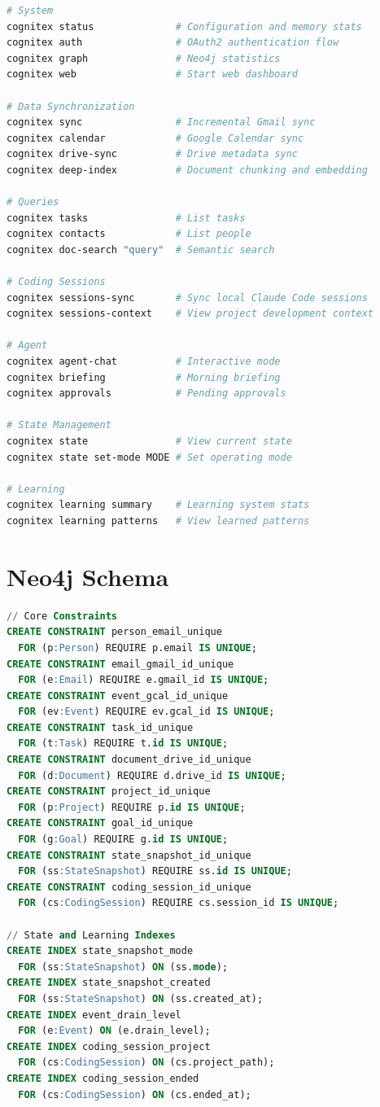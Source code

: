 \documentclass[11pt,a4paper]{article}
\begin{document}
\begin{lstlisting}[language=bash,caption={Primary CLI commands}]
# System
cognitex status              # Configuration and memory stats
cognitex auth                # OAuth2 authentication flow
cognitex graph               # Neo4j statistics
cognitex web                 # Start web dashboard

# Data Synchronization
cognitex sync                # Incremental Gmail sync
cognitex calendar            # Google Calendar sync
cognitex drive-sync          # Drive metadata sync
cognitex deep-index          # Document chunking and embedding

# Queries
cognitex tasks               # List tasks
cognitex contacts            # List people
cognitex doc-search "query"  # Semantic search

# Coding Sessions
cognitex sessions-sync       # Sync local Claude Code sessions
cognitex sessions-context    # View project development context

# Agent
cognitex agent-chat          # Interactive mode
cognitex briefing            # Morning briefing
cognitex approvals           # Pending approvals

# State Management
cognitex state               # View current state
cognitex state set-mode MODE # Set operating mode

# Learning
cognitex learning summary    # Learning system stats
cognitex learning patterns   # View learned patterns
\end{lstlisting}

\section{Neo4j Schema}
\label{app:schema}

\begin{lstlisting}[language=SQL,caption={Neo4j constraints and indexes}]
// Core Constraints
CREATE CONSTRAINT person_email_unique
  FOR (p:Person) REQUIRE p.email IS UNIQUE;
CREATE CONSTRAINT email_gmail_id_unique
  FOR (e:Email) REQUIRE e.gmail_id IS UNIQUE;
CREATE CONSTRAINT event_gcal_id_unique
  FOR (ev:Event) REQUIRE ev.gcal_id IS UNIQUE;
CREATE CONSTRAINT task_id_unique
  FOR (t:Task) REQUIRE t.id IS UNIQUE;
CREATE CONSTRAINT document_drive_id_unique
  FOR (d:Document) REQUIRE d.drive_id IS UNIQUE;
CREATE CONSTRAINT project_id_unique
  FOR (p:Project) REQUIRE p.id IS UNIQUE;
CREATE CONSTRAINT goal_id_unique
  FOR (g:Goal) REQUIRE g.id IS UNIQUE;
CREATE CONSTRAINT state_snapshot_id_unique
  FOR (ss:StateSnapshot) REQUIRE ss.id IS UNIQUE;
CREATE CONSTRAINT coding_session_id_unique
  FOR (cs:CodingSession) REQUIRE cs.session_id IS UNIQUE;

// State and Learning Indexes
CREATE INDEX state_snapshot_mode
  FOR (ss:StateSnapshot) ON (ss.mode);
CREATE INDEX state_snapshot_created
  FOR (ss:StateSnapshot) ON (ss.created_at);
CREATE INDEX event_drain_level
  FOR (e:Event) ON (e.drain_level);
CREATE INDEX coding_session_project
  FOR (cs:CodingSession) ON (cs.project_path);
CREATE INDEX coding_session_ended
  FOR (cs:CodingSession) ON (cs.ended_at);
\end{lstlisting}
\end{document}
